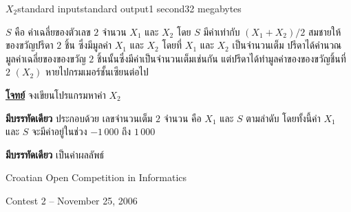 \documentclass[11pt,a4paper]{article}
\begin{document}
\begin{problem}{$X_2$}{standard input}{standard output}{1 second}{32 megabytes}

$S$ คือ ค่าเฉลี่ยของตัวเลข $2$ จำนวน $X_1$ และ $X_2$ โดย $S$ มีค่าเท่ากับ $(X_1+X_2)/2$
สมชายให้ของขวัญปรีดา $2$ ชิ้น ซึ่งมีมูลค่า $X_1$ และ $X_2$ โดยที่ $X_1$ และ $X_2$ เป็นจำนวนเต็ม ปรีดาได้คำนวณมูลค่าเฉลี่ยของของขวัญ $2$ ชิ้นนั้นซึ่งมีค่าเป็นจำนวนเต็มเช่นกัน แต่ปรีดาได้ทำมูลค่าของของขวัญชิ้นที่ $2$ $(X_2)$ หายไปกรมเมอร์ชั้นเซียนต่อไป

\underline{\textbf{โจทย์}} จงเขียนโปรแกรมหาค่า $X_2$

\InputFile

\textbf{มีบรรทัดเดียว} ประกอบด้วย เลขจำนวนเต็ม $2$ จำนวน คือ $X_1$ และ $S$ ตามลำดับ โดยทั้งนี้ค่า $X_1$ และ $S$ จะมีค่าอยู่ในช่วง $-1\,000$ ถึง $1\,000$


\OutputFile

\textbf{มีบรรทัดเดียว} เป็นค่าผลลัพธ์

\Examples

\begin{example}
%
%
\end{example}

\Source

Croatian Open Competition in Informatics

Contest 2 – November 25, 2006

\end{problem}
\end{document}
